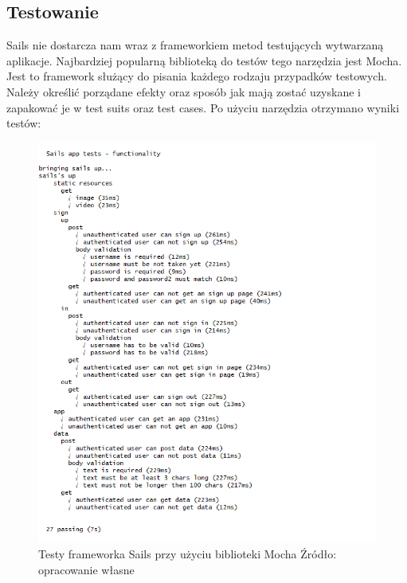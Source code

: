 \documentclass[12pt]{report}
\begin{document}
    \subsection{Testowanie}
      Sails nie dostarcza nam wraz z frameworkiem metod testujących wytwarzaną aplikacje. 
      Najbardziej popularną biblioteką do testów tego narzędzia jest Mocha.
      Jest to framework służący do pisania każdego rodzaju przypadków testowych.
      Należy określić porządane efekty oraz sposób jak mają zostać uzyskane i zapakować je w test suits oraz test cases.
      Po użyciu narzędzia otrzymano wyniki testów:
      \begin{figure}[!hb]
        \centering
        \includegraphics[width=\textwidth,height=\textheight,keepaspectratio]{test_Sails.png} 
        \caption{Testy frameworka Sails przy użyciu biblioteki Mocha \newline Źródło: opracowanie własne}
      \end{figure}
\end{document}
